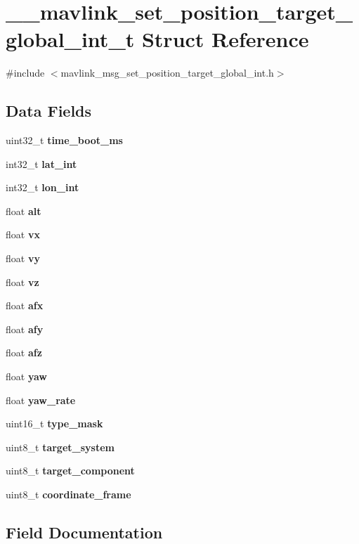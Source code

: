 \section{\+\_\+\+\_\+mavlink\+\_\+set\+\_\+position\+\_\+target\+\_\+global\+\_\+int\+\_\+t Struct Reference}
\label{struct____mavlink__set__position__target__global__int__t}


{\ttfamily \#include $<$mavlink\+\_\+msg\+\_\+set\+\_\+position\+\_\+target\+\_\+global\+\_\+int.\+h$>$}

\subsection*{Data Fields}
\begin{DoxyCompactItemize}
\item 
uint32\+\_\+t \textbf{ time\+\_\+boot\+\_\+ms}
\item 
int32\+\_\+t \textbf{ lat\+\_\+int}
\item 
int32\+\_\+t \textbf{ lon\+\_\+int}
\item 
float \textbf{ alt}
\item 
float \textbf{ vx}
\item 
float \textbf{ vy}
\item 
float \textbf{ vz}
\item 
float \textbf{ afx}
\item 
float \textbf{ afy}
\item 
float \textbf{ afz}
\item 
float \textbf{ yaw}
\item 
float \textbf{ yaw\+\_\+rate}
\item 
uint16\+\_\+t \textbf{ type\+\_\+mask}
\item 
uint8\+\_\+t \textbf{ target\+\_\+system}
\item 
uint8\+\_\+t \textbf{ target\+\_\+component}
\item 
uint8\+\_\+t \textbf{ coordinate\+\_\+frame}
\end{DoxyCompactItemize}


\subsection{Field Documentation}
\mbox{\label{struct____mavlink__set__position__target__global__int__t_a7db44bb9672bc444e2aeab70335bb864}} 

